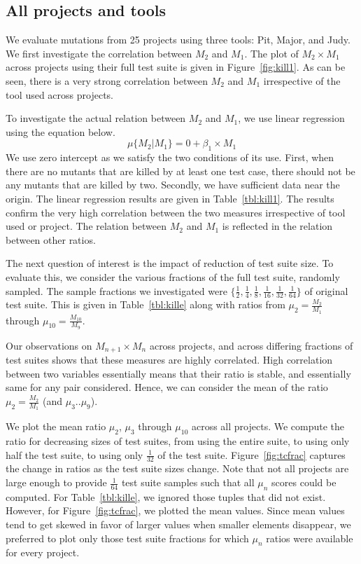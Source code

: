 \documentclass[conference]{IEEEtran}
\newcounter{observation}
\begin{document}
\subsection{All projects and tools}
We evaluate mutations from 25 projects using three tools:
Pit, Major, and Judy.
We first investigate the correlation between $M_2$ and $M_1$.
The plot of $M_2\times M_1$ across projects using their full test suite is given
in Figure~\ref{fig:kill1}. As can be seen, there is a very strong correlation
between $M_2$ and $M_1$ irrespective of the tool used across projects.

To investigate the actual relation between $M_2$ and $M_1$, we use linear
regression using the equation below.
\[
\mu\{M_2 | M_1\} = 0 + \beta_1 \times M_1
\]
We use zero intercept as we satisfy the two conditions of its use.
First, when there are no mutants that are killed by at least one test case,
there should not be any mutants that are killed by two. Secondly, we have
sufficient data near the origin.
The linear regression results are given in Table~\ref{tbl:kill1}. The results
confirm the very high correlation between the two measures irrespective of tool
used or project.
The relation between $M_2$ and $M_1$ is reflected in the relation
between other ratios.

The next question of interest is the impact of reduction of test suite size.
To evaluate this, we consider the various fractions of the full test suite,
randomly sampled. The sample fractions we investigated were
$\{\frac{1}{2},\frac{1}{4},\frac{1}{8},\frac{1}{16},\frac{1}{32},\frac{1}{64}\}$ of original test suite.
This is given in Table~\ref{tbl:kille} along with ratios from $\mu_2 = \frac{M_{2}}{M_{1}}$ through $\mu_{10} = \frac{M_{10}}{M_9}$.

Our observations on $M_{n+1}\times M_n$ across projects, and across differing
fractions of test suites shows that these measures are highly
correlated. High correlation between two variables essentially means that their
ratio is stable, and essentially same for any pair considered.
Hence, we can consider the mean of the ratio $\mu_2 = \frac{M_2}{M_1}$
(and $\mu_3 .. \mu_9$).

We plot the mean ratio $\mu_2$, $\mu_3$ through $\mu_{10}$ across all projects.
We compute the ratio for decreasing sizes of test suites, from using the entire
suite, to using only half the test suite, to using only $\frac{1}{32}$ of the
test suite. Figure~\ref{fig:tcfrac} captures the change in ratios as the test suite
sizes change. Note that not all projects are large enough to
provide $\frac{1}{64}$ test suite samples such that all $\mu_{n}$ scores could
be computed.
For Table~\ref{tbl:kille}, we ignored those tuples that did not exist.
However, for Figure~\ref{fig:tcfrac}, we plotted the mean values.
Since mean values tend to get skewed in favor of larger values when smaller
elements disappear, we preferred to plot only those test suite fractions
for which $\mu_{n}$ ratios were available for every project.
\end{document}
